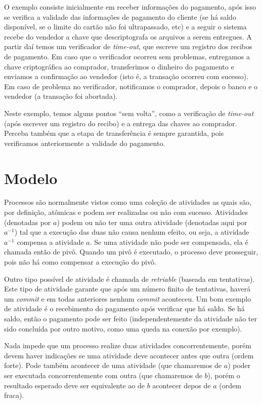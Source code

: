 \documentclass[a4paper,12pt,notitlepage]{article}
\begin{document}
O exemplo consiste inicialmente em receber informações do pagamento, após isso
se verifica a validade das informações de pagamento do cliente (se há saldo disponível, se o limite do cartão não foi ultrapassado, etc) e a seguir o sistema recebe do vendedor a chave que descriptografa os arquivos a serem entregues. 
A partir daí temos um verificador de \textit{time-out}, que escreve um registro dos recibos de pagamento. Em caso que o verificador ocorreu sem problemas, entregamos a chave criptográfica ao comprador, transferimos o dinheiro do pagamento e enviamos a confirmação ao vendedor (isto é, a transação ocorreu com sucesso). Em caso de problema no verificador, notificamos o comprador, depois o banco e o vendedor (a transação foi abortada). 

Neste exemplo, temos alguns pontos ``sem volta'', como a verificação de \textit{time-out} (após escrever um registro do recibo) e a entrega das chaves ao comprador. Perceba também que a etapa de transferência é sempre garantida, pois verificamos anteriormente a validade do pagamento. 


\newpage

\section{Modelo}

Processos são normalmente vistos como uma coleção de atividades as quais são, por definição, atômicas e podem ser realizadas ou não com sucesso. Atividades (denotadas por $a$) podem ou não ter uma outra atividade (denotadas aqui por $a^{-1}$) tal que a execução das duas não causa nenhum efeito, ou seja, a atividade $a^{-1}$ compensa a atividade $a$. Se uma atividade não pode
ser compensada, ela é chamada então de pivô. Quando um pivô é executado, o processo deve prosseguir, pois não há como compensar a execução do pivô.

Outro tipo possível de atividade é chamada de \textit{retriable} (baseada em tentativas). Este tipo de atividade garante que após um número finito de tentativas, haverá um \textit{commit} e em todas anteriores nenhum \textit{commit} aconteceu. Um bom exemplo de atividade é o recebimento do pagamento após verificar que há saldo. Se há saldo, então o pagamento pode ser feito (independentemente da atividade não ter sido concluída por outro motivo, como uma queda na conexão por exemplo).

Nada impede que um processo realize duas atividades concorrentemente, porém devem haver indicações se uma atividade deve acontecer antes que outra (ordem forte). Pode também acontecer de uma atividade (que chamaremos de $a$) poder ser executada concorrentemente com outra (que chamaremos de $b$), porém o resultado esperado deve ser equivalente ao de $b$ acontecer depos de $a$ (ordem fraca).
\end{document}

